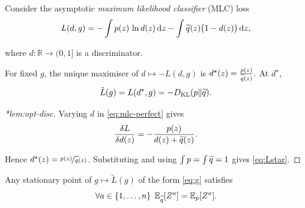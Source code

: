\begin{definition}
 Consider the asymptotic \emph{maximum likelihood classifier} (MLC) loss
\begin{equation}
\label{eq:mlc-perfect}
    L(d,g) = -\int p(z)\,\ln d(z)\,\dd z - \int \widetilde{q}(z)\big(1-d(z)\big)\,\dd z,
\end{equation}

where $d:\mathbb{R}\to(0,1]$ is a discriminator.
\end{definition}

\begin{theorem}\label{lem:opt-disc}
For fixed $g$, the unique maximiser of $d\mapsto -L(d,g)$ is
\(
d^\star(z)=\frac{p(z)}{\widetilde{q}(z)}.
\)
At $d^\star$,
\begin{equation}\label{eq:Lstar}
    \tilde L(g) = L(d^\star,g) = - D_{\mathrm{KL}}\qty(p\|\widetilde{q}).
\end{equation}
\end{theorem}

\begin{proof}[*lem:opt-disc]
Varying $d$ in \cref{eq:mlc-perfect} gives
\[
    \frac{\delta L}{\delta d(z)} = -\frac{p(z)}{d(z)+\widetilde{q}(z)}.
\]

Hence $d^\star(z)=\nicefrac{p(z)}{\widetilde{q}(z)}$. Substituting and using $\int p=\int \widetilde{q}=1$ gives \cref{eq:Lstar}.
\end{proof}

\begin{theorem}\label{thm:perfect-closure}
Any stationary point of $g\mapsto \tilde L(g)$ of the form \cref{eq:g} satisfies
\begin{equation}\label{eq:moment-match-perfect}
    \forall a\in \{1,\dots, n\}\;\operatorname{\mathbb{E}}_{\widetilde{q}}[Z^a] = \operatorname{\mathbb{E}}_{p}[Z^a].
\end{equation}
\end{theorem}

